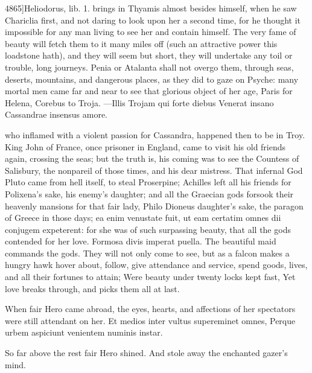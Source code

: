 {4865]Heliodorus, lib. 1. brings in Thyamis almost besides himself, when
he saw Chariclia first, and not daring to look upon her a second time,
for he thought it impossible for any man living to see her and contain
himself. The very fame of beauty will fetch them to it many miles off
(such an attractive power this loadstone hath), and they will seem but
short, they will undertake any toil or trouble, long journeys.
Penia or Atalanta shall not overgo them, through seas, deserts,
mountains, and dangerous places, as they did to gaze on Psyche: many
mortal men came far and near to see that glorious object of her age,
Paris for Helena, Corebus to Troja.
---Illis Trojam qui forte diebus
Venerat insano Cassandrae insensus amore.

who inflamed with a violent passion for Cassandra, happened then to be
in Troy. King John of France, once prisoner in England, came to visit
his old friends again, crossing the seas; but the truth is, his coming
was to see the Countess of Salisbury, the nonpareil of those times, and
his dear mistress. That infernal God Pluto came from hell itself, to
steal Proserpine; Achilles left all his friends for Polixena's sake,
his enemy's daughter; and all the Graecian gods forsook their
heavenly mansions for that fair lady, Philo Dioneus daughter's sake,
the paragon of Greece in those days; ea enim venustate fuit, ut eam
certatim omnes dii conjugem expeterent: for she was of such surpassing
beauty, that all the gods contended for her love. Formosa divis
imperat puella. The beautiful maid commands the gods. They will not
only come to see, but as a falcon makes a hungry hawk hover about,
follow, give attendance and service, spend goods, lives, and all their
fortunes to attain;
Were beauty under twenty locks kept fast,
Yet love breaks through, and picks them all at last.

When fair Hero came abroad, the eyes, hearts, and affections of
her spectators were still attendant on her.
Et medios inter vultus supereminet omnes,
Perque urbem aspiciunt venientem numinis instar.

So far above the rest fair Hero shined.
And stole away the enchanted gazer's mind.

}
